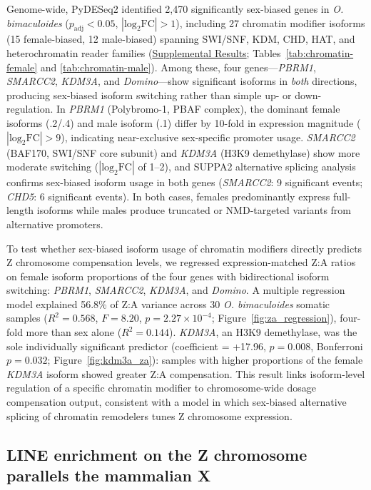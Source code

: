 \documentclass[12pt]{article}
\begin{document}
Genome-wide, PyDESeq2 identified 2,470 significantly sex-biased genes
in \textit{O. bimaculoides}
($p_\text{adj} < 0.05$, $|\text{log}_2\text{FC}| > 1$),
including 27 chromatin modifier isoforms (15 female-biased, 12 male-biased)
spanning SWI/SNF, KDM, CHD, HAT, and heterochromatin reader families
(\hyperref[sec:supp_chromatin]{Supplemental Results};
Tables~\ref{tab:chromatin-female} and \ref{tab:chromatin-male}).
Among these, four genes---\textit{PBRM1}, \textit{SMARCC2}, \textit{KDM3A}, and \textit{Domino}---show
significant isoforms in \emph{both} directions,
producing sex-biased isoform switching rather than simple up- or down-regulation.
In \textit{PBRM1} (Polybromo-1, PBAF complex),
the dominant female isoforms (.2/.4) and male isoform (.1) differ by 10-fold
in expression magnitude ($|\text{log}_2\text{FC}| > 9$),
indicating near-exclusive sex-specific promoter usage.
\textit{SMARCC2} (BAF170, SWI/SNF core subunit) and \textit{KDM3A} (H3K9 demethylase)
show more moderate switching ($|\text{log}_2\text{FC}|$ of 1--2),
and SUPPA2 alternative splicing analysis confirms sex-biased isoform usage
in both genes (\textit{SMARCC2}: 9 significant events; \textit{CHD5}: 6 significant events).
In both cases, females predominantly express full-length isoforms
while males produce truncated or NMD-targeted variants from alternative promoters.

To test whether sex-biased isoform usage of chromatin modifiers
directly predicts Z chromosome compensation levels,
we regressed expression-matched Z:A ratios on female isoform proportions
of the four genes with bidirectional isoform switching:
\textit{PBRM1}, \textit{SMARCC2}, \textit{KDM3A}, and \textit{Domino}.
A multiple regression model explained 56.8\% of Z:A variance
across 30 \textit{O. bimaculoides} somatic samples
($R^2 = 0.568$, $F = 8.20$, $p = 2.27 \times 10^{-4}$;
Figure~\ref{fig:za_regression}),
four-fold more than sex alone ($R^2 = 0.144$).
\textit{KDM3A}, an H3K9 demethylase, was the sole individually significant predictor
(coefficient = +17.96, $p = 0.008$, Bonferroni $p = 0.032$;
Figure~\ref{fig:kdm3a_za}):
samples with higher proportions of the female \textit{KDM3A} isoform
showed greater Z:A compensation.
This result links isoform-level regulation of a specific chromatin modifier
to chromosome-wide dosage compensation output,
consistent with a model in which sex-biased alternative splicing
of chromatin remodelers tunes Z chromosome expression.

\subsection*{LINE enrichment on the Z chromosome parallels the mammalian X}
\end{document}
